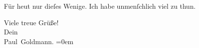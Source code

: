 \pstart
           {\pb}Für heut nur dieſes
               Wenige. Ich habe unmenſchlich viel zu thun.\pend
           
\pstart
           Viele treue Grüße! {\\[\baselineskip]}Dein {\\[\baselineskip]}\spacefill\mbox{Paul Goldmann.}\pend
           \leftskip=0em{}\endnumbering{}  \newcommand{\dateiname}{L02924}\newcommand{\titel}{Paul Goldmann an Arthur Schnitzler, 18. 7. [1900]}\newcommand{\editorInnen}{Martin Anton Müller und Laura Untner}
